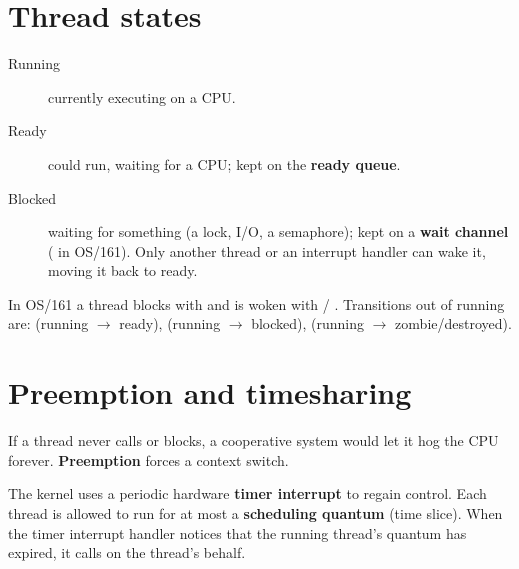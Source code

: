 \section{Thread states}

\begin{center}
\end{center}

\begin{description}
  \item[Running] currently executing on a CPU.
  \item[Ready] could run, waiting for a CPU; kept on the \textbf{ready queue}.
  \item[Blocked] waiting for something (a lock, I/O, a semaphore); kept on a \textbf{wait
    channel} ( in OS/161). Only another thread or an interrupt handler can
    wake it, moving it back to ready.
\end{description}
In OS/161 a thread blocks with  and is woken with
 / . Transitions out of running are:
 (running $\to$ ready),  (running $\to$ blocked),
 (running $\to$ zombie/destroyed).

\section{Preemption and timesharing}

If a thread never calls  or blocks, a cooperative system would let it hog the
CPU forever. \textbf{Preemption} forces a context switch.

\begin{definition}
The kernel uses a periodic hardware \textbf{timer interrupt} to regain control. Each thread is
allowed to run for at most a \textbf{scheduling quantum} (time slice). When the timer interrupt
handler notices that the running thread's quantum has expired, it calls  on
the thread's behalf.
\end{definition}

